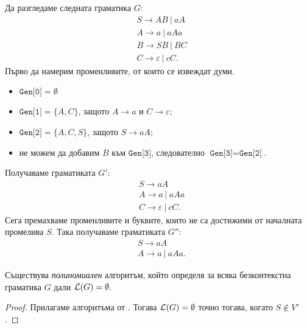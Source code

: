 {\scriptsize
  \begin{multicols}{2}
\begin{example}
  Да разгледаме следната граматика $G$:
  \begin{align*}
    & S \to AB\ |\ aA\\
    & A \to a\ |\ aAa\\
    & B \to SB\ |\ BC\\
    & C \to \varepsilon\ |\ cC.
  \end{align*}
  Първо да намерим променливите, от които се извеждат думи.
  \begin{itemize}
  \item
    $\texttt{Gen[0]} = \emptyset$
  \item 
    $\texttt{Gen[1]} = \{A, C\}$, защото $A \to a$ и $C \to \varepsilon$;
  \item
    $\texttt{Gen[2]} = \{A, C, S\}$, защото $S \to aA$;
  \item
    не можем да добавим $B$ към $\texttt{Gen[3]}$, следователно $\texttt{Gen[3]} = \texttt{Gen[2]}$.
  \end{itemize}
  Получаваме граматиката $G'$:
  \begin{align*}
    & S \to aA\\
    & A \to a\ |\ aAa\\
    & C \to \varepsilon\ |\ cC.
  \end{align*}
  Сега премахваме променливите и буквите, които не са достижими от началната промелива $S$. Така получаваме граматиката $G''$:
  \begin{align*}
    & S \to aA\\
    & A \to a\ |\ aAa.
  \end{align*}
\end{example}

\end{multicols}
}


\begin{framed}
  \begin{corollary}
    Съществува {\em полиномиален} алгоритъм, който определя за всяка безконтекстна граматика $G$ дали $\mathcal{L}(G) = \emptyset$.
  \end{corollary}  
\end{framed}
\begin{proof}
  Прилагаме алгоритъма от .
  Тогава $\mathcal{L}(G) = \emptyset$ точно тогава, когато $S \not\in V'$.  
\end{proof}

